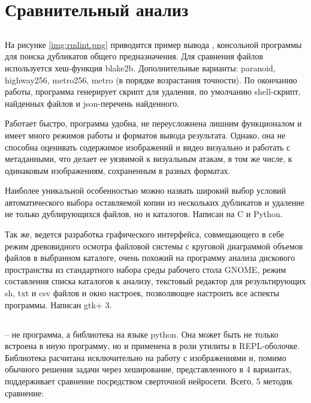\documentclass[variant=courcework]{bsuir}
\begin{document}
\section{Сравнительный анализ}

\subsection*{}

На рисунке \ref{img:rmlint.png} приводится пример вывода ,
консольной программы для поиска дубликатов общего предназначения. Для сравнения
файлов используется хеш-функция blake2b. Дополнительные варианты: paranoid,
highway256, metro256, metro (в порядке возрастания точности). По окончанию
работы, программа генерирует скрипт для удаления, по умолчанию shell-скрипт,
найденных файлов и json-перечень найденного.

Работает быстро, программа удобна, не переусложнена лишним функционалом и имеет
много режимов работы и форматов вывода результата. Однако, она не способна
оценивать содержимое изображений и видео визуально и работать с метаданными, что
делает ее уязвимой к визуальным атакам, в том же числе, к одинаковым
изображениям, сохраненным в разных форматах.


Наиболее уникальной особенностью можно назвать широкий выбор условий
автоматического выбора оставляемой копии из нескольких дубликатов и удаление не
только дублирующихся файлов, но и каталогов. Написан на C и Python.

Так же, ведется разработка графического интерфейса, совмещающего в себе режим
древовидного осмотра файловой системы с круговой диаграммой объемов файлов в
выбранном каталоге, очень похожий на программу анализа дискового пространства из
стандартного набора среды рабочего стола GNOME, режим составления списка
каталогов к анализу, текстовый редактор для результирующих sh, txt и csv файлов
и окно настроек, позволяющее настроить все аспекты программы. Написан gtk+ 3.


\subsection*{}

 -- не программа, а библиотека на языке python. Она может
быть не только встроена в иную программу, но и применена в роли утилиты в
REPL-оболочке. Библиотека расчитана исключительно на работу с изображениями и,
помимо обычного решения задачи через хеширование, представленного в 4 вариантах,
поддерживает сравнение посредством сверточной нейросети. Всего, 5 методик
сравнение:
\end{document}
